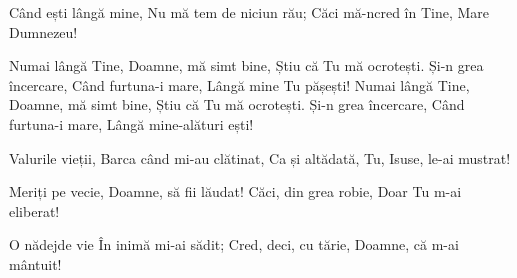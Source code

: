 
\beginverse
Când ești lângă mine,
Nu mă tem de niciun rău;
Căci mă-ncred în Tine,
Mare Dumnezeu!
\endverse

\beginchorus
Numai lângă Tine,
Doamne, mă simt bine,
Știu că Tu mă ocrotești.
Și-n grea încercare,
Când furtuna-i mare,
Lângă mine Tu pășești!
Numai lângă Tine,
Doamne, mă simt bine,
Știu că Tu mă ocrotești.
Și-n grea încercare,
Când furtuna-i mare,
Lângă mine-alături ești!
\endchorus

\beginverse
Valurile vieții,
Barca când mi-au clătinat,
Ca și altădată,
Tu, Isuse, le-ai mustrat!
\endverse

\beginverse
Meriți pe vecie,
Doamne, să fii lăudat!
Căci, din grea robie,
Doar Tu m-ai eliberat!
\endverse

\beginverse
O nădejde vie
În inimă mi-ai sădit;
Cred, deci, cu tărie,
Doamne, că m-ai mântuit!
\endverse

\endsong